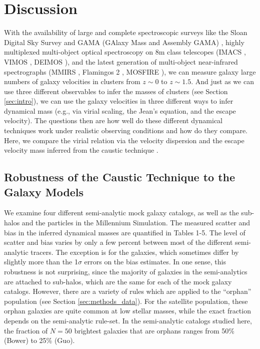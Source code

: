 \documentclass[iop]{emulateapj}
\begin{document}
\section{Discussion}
\label{sec:Discussion}

With the availability of large and complete spectroscopic surveys like the Sloan Digital Sky Survey \citep[SDSS]{Stroughton02} and GAMA (GAlaxy Mass and Assembly GAMA) \citep{Driver11}, highly multiplexed multi-object optical spectroscopy on 8m class telescopes (IMACS \citep{Dressler11}, VIMOS \citep{LeFevre03}, DEIMOS \citep{Davis03}), and the latest generation of multi-object near-infrared spectrographs (MMIRS \citep{McLeod04}, Flamingos 2 \citep{Eikenberry06}, MOSFIRE \citep{McLean08}), we can measure galaxy large numbers of galaxy velocities in clusters from $z \sim 0$ to $z \sim 1.5$. And just as we can use three different observables to infer the masses of clusters (see Section \ref{sec:intro}), we can use the galaxy velocities in three different ways to infer dynamical mass (e.g., via virial scaling, the Jean's equation, and the escape velocity). The questions then are how well do these different dynamical techniques work under realistic observing conditions and how do they compare. Here, we compare the virial relation via the velocity dispersion \citep{Evrard08} and the escape velocity mass inferred from the caustic technique \citep{Diaferio97}.

\subsection{Robustness of the Caustic Technique to the Galaxy Models}
\label{sec:robust}

We examine four different semi-analytic mock galaxy catalogs, as well as the sub-halos and the particles in the Millennium Simulation. The measured scatter and bias in the inferred dynamical masses are quantified in Tables 1-5. The level of scatter and bias varies by only a few percent between most of the different semi-analytic tracers. The exception is for the \citet{Bower06} galaxies, which sometimes differ by slightly more than the 1$\sigma$ errors on the bias estimates. In one sense, this robustness is not surprising, since the majority of galaxies in the semi-analytics are attached to sub-halos, which are the same for each of the mock galaxy catalogs. However, there are a variety of rules which are applied to the ``orphan'' population (see Section \ref{sec:methods_data}). For the satellite population, these orphan galaxies are quite common at low stellar masses, while the exact fraction depends on the semi-analytic rule-set. In the semi-analytic catalogs studied here, the fraction of $N=50$ brightest galaxies that are orphans ranges from 50\% (Bower) to 25\% (Guo).
\end{document}
